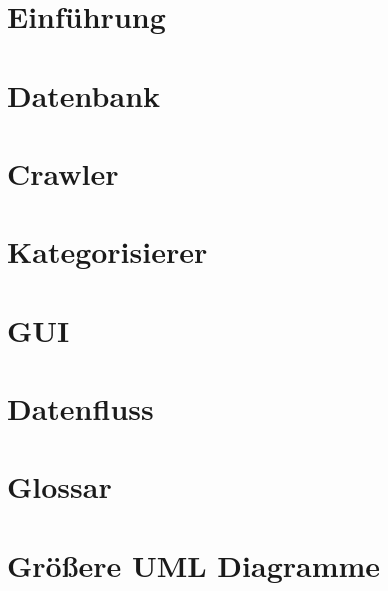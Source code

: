 

	\maketitle
	\setcounter{tocdepth}{1}
	\tableofcontents

	\chapter{Einführung}
			
	\chapter{Datenbank}
	\label{chap:datenbank}
		
	\chapter{Crawler}
	\label{chap:crawler}
		
	\chapter{Kategorisierer}
	\label{chap:kategorisierer}
		
	\chapter{GUI}
	\label{chap:gui}
		
	\chapter{Datenfluss}
	\label{chap:datenfluss}
		
	\chapter{Glossar}
		
	\chapter{Größere UML Diagramme}
		
	\listoffigures

